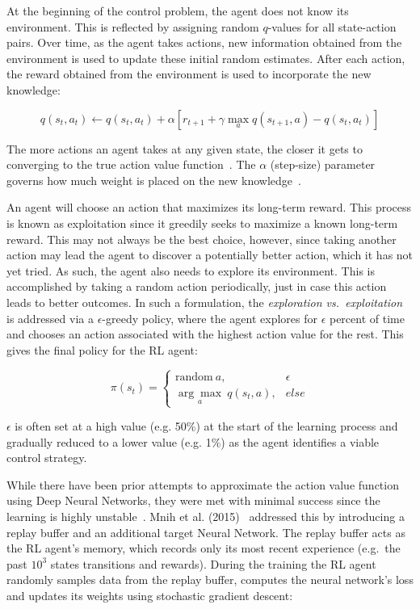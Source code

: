 At the beginning of the control problem, the agent does not know its environment.
This is reflected by assigning random $q$-values for all state-action pairs.
Over time, as the agent takes actions, new information obtained from the environment is used to update these initial random estimates.
After each action, the reward obtained from the environment is used to incorporate the new knowledge:

\begin{equation}
    q(s_t,a_t ) \leftarrow q(s_t,a_t ) + \alpha \left[ r_{t+1}+\gamma  \max_a q(s_{t+1},a) - q(s_t,a_t ) \right]
\end{equation}

The more actions an agent takes at any given state, the closer it gets to converging to the true action value function~\cite{Sutton98}.
The $\alpha$ (step-size) parameter governs how much weight is placed on the new knowledge~\cite{Sutton98}.

An agent will choose an action that maximizes its long-term reward.
This process is known as exploitation since it greedily seeks to maximize a known long-term reward.
This may not always be the best choice, however, since taking another action may lead the agent to discover a potentially better action, which it has not yet tried.
As such, the agent also needs to explore its environment.
This is accomplished by taking a random action periodically, just in case this action leads to better outcomes.
In such a formulation, the \textit{exploration vs.\ exploitation} is addressed via a $\epsilon$-greedy policy, where the agent explores for $\epsilon$ percent of time and chooses an action associated with the highest action value for the rest.
This gives the final policy for the RL agent:

\begin{equation}
    \pi(s_t) = \begin{cases}
    \text{random} \  a, & \epsilon  \\
    \underset{a}{\arg\max} \ q(s_t,a), & else
    \end{cases}
\end{equation}

$\epsilon$ is often set at a high value (e.g. 50\%) at the start of the learning process and gradually reduced to a lower value (e.g. 1\%) as the agent identifies a viable control strategy.

While there have been prior attempts to approximate the action value function using Deep Neural Networks, they were met with minimal success since the learning is highly unstable~\cite{Mnih2015}.
Mnih et al. (2015)~\cite{Mnih2015} addressed this by introducing a replay buffer and an additional target Neural Network.
The replay buffer acts as the RL agent’s memory, which records only its most recent experience (e.g.\ the past $10^3$ states transitions and rewards).
During the training the RL agent randomly samples data from the replay buffer, computes the neural network’s loss and updates its weights using stochastic gradient descent:


